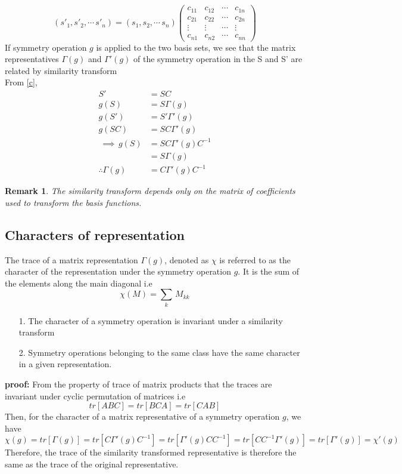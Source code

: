 \documentclass[a4paper, 12pt, openany]{report}
\newtheorem{rmk}{Remark}[section]
\begin{document}
$$(s'_1,s'_2,\cdots\,s'_n)=(s_1,s_2,\cdots\,s_n)\begin{pmatrix}
c_{11}&c_{12}&\cdots&c_{1n}\\c_{21}&c_{22}&\cdots&c_{2n}\\\vdots&\vdots&\cdots&\vdots\\c_{n1}&c_{n2}&\cdots&c_{nn}\end{pmatrix}$$
 If symmetry operation $g$ is applied to the two basis sets, we see that the  matrix representatives $\Gamma(g)$ and $\Gamma'(g)$ of the symmetry operation in the S and S’ are related by similarity transform \\
 From \ref{c}, 
 \begin{align*}S'&= SC\\
 g(S)&=S\Gamma(g)\\
  g(S')&=S'\Gamma'(g)\\
   g(SC)&=SC\Gamma'(g) \\\
 \implies\,g(S)&=SC\Gamma'(g)C^{-1}\\
  &=S\Gamma(g)\\
  \therefore\Gamma(g)&=C\Gamma'(g)C^{-1}
  \end{align*}
\begin{rmk} The similarity transform depends only on the matrix of \break coefficients used to transform the basis functions.
	\end{rmk}

\subsection*{Characters of representation}
The trace of a matrix representation $\Gamma(g)$, denoted as $\chi$ is referred to as the \linebreak character of the representation under the symmetry operation $g$. It is the sum of the elements along the main diagonal i.e 
$$\chi(M)=\sum_k\,M_{kk}$$
\begin{itemize}
\item[1.] The character of a symmetry operation is invariant under a similarity \linebreak transform
\item[2.] Symmetry operations belonging to the same class have the same \break character in a given representation. \end{itemize}

\textbf{proof:} From the property of trace of  matrix products that the traces are \linebreak invariant under cyclic permutation of matrices i.e
$$tr[ABC]=tr[BCA]=tr[CAB]$$ Then, for the character of a matrix representative of a symmetry operation $g$, we have 
$$\chi(g)=tr[\Gamma(g)]=tr[C\Gamma'(g)C^{-1}]=tr[\Gamma'(g)CC^{-1}]=tr[CC^{-1}\Gamma'(g)]=tr[\Gamma'(g)]=\chi'(g)$$
Therefore, the trace of the similarity transformed representative is therefore the same as the trace of the original representative.
\end{document}
